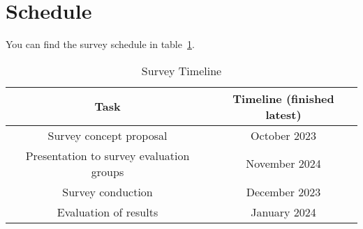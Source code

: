 \documentclass[%
class=scrreprt,
chapterprefix=false,%
open=right,%
twoside=false,%
paper=a4,%
logofile={Logo\_zentral\_farbig\_EN.png},%
thesistype=masterproposal,%
UKenglish,%
]{se2thesis}
\begin{document}


\section{Schedule}
You can find the survey schedule in table~\ref{tab:survey-timeline}.

\begin{table}[ht]
	\centering
	\begin{tabular}{|c|c|}
		\hline
		\textbf{Task} & \textbf{Timeline (finished latest)} \\
		\hline
		Survey concept proposal & October 2023 \\
		\hline
		Presentation to survey evaluation groups & November 2024 \\
		\hline
		Survey conduction & December 2023 \\
		\hline
		Evaluation of results & January 2024 \\
		\hline
	\end{tabular}
	\caption{Survey Timeline}
	\label{tab:survey-timeline}
\end{table}
\end{document}
